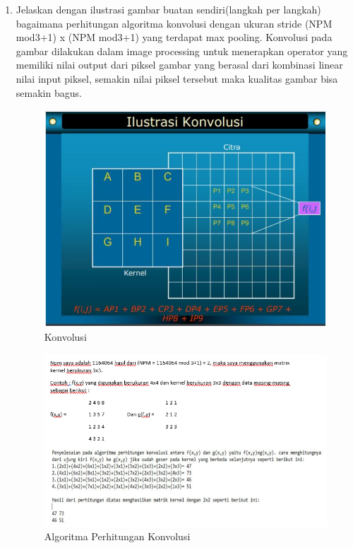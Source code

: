 \begin{enumerate}
\item Jelaskan dengan ilustrasi gambar buatan sendiri(langkah per langkah) bagaimana perhitungan algoritma konvolusi dengan ukuran stride (NPM mod3+1) x (NPM mod3+1) yang terdapat max pooling.
\subitem Konvolusi pada gambar dilakukan dalam image processing untuk menerapkan operator yang memiliki nilai output dari piksel gambar yang berasal dari kombinasi linear nilai input piksel, semakin nilai piksel tersebut maka kualitas gambar bisa semakin bagus.
\begin{figure}[!htbp]
	\centerline{\includegraphics[width=1\textwidth]{figures/andi/7-131.PNG}}
	\caption{Konvolusi}
	\label{Teori}
\end{figure}

\begin{figure}[!htbp]
	\centerline{\includegraphics[width=1\textwidth]{figures/andi/7-132.PNG}}
	\caption{Algoritma Perhitungan Konvolusi}
	\label{Teori}
\end{figure}

\end{enumerate}

